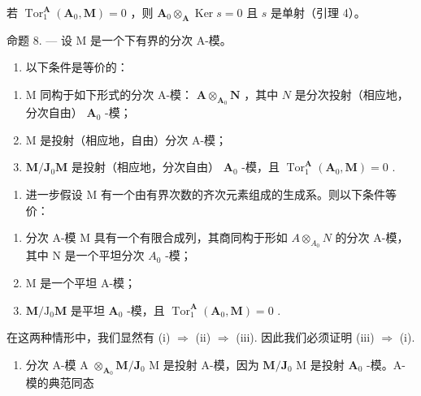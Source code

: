 若 \(\operatorname{Tor}_1^{\mathbf{A}}(\mathbf{A}_0, \mathbf{M}) = 0\) ，则 \(\mathbf{A}_0 \otimes_{\mathbf{A}} \operatorname{Ker} s = 0\) 且 \(s\) 是单射（引理 4）。

命题 8. --- 设 M 是一个下有界的分次 A-模。

\begin{enumerate}
\def\labelenumi{\alph{enumi})}
\tightlist
\item
  以下条件是等价的：
\end{enumerate}

\begin{enumerate}
\def\labelenumi{(\roman{enumi})}
\item
  M 同构于如下形式的分次 A-模： \(\mathbf{A} \otimes_{\mathbf{A}_0} \mathbf{N}\) ，其中 \(N\) 是分次投射（相应地，分次自由） \(\mathbf{A}_0\) -模；
\item
  M 是投射（相应地，自由）分次 A-模；
\item
  \(\mathbf{M} / \mathbf{J}_0\mathbf{M}\) 是投射（相应地，分次自由） \(\mathbf{A}_0\) -模，且 \(\operatorname{Tor}_1^{\mathbf{A}}(\mathbf{A}_0,\mathbf{M}) = 0\) .
\end{enumerate}

\begin{enumerate}
\def\labelenumi{\alph{enumi})}
\setcounter{enumi}{1}
\tightlist
\item
  进一步假设 M 有一个由有界次数的齐次元素组成的生成系。则以下条件等价：
\end{enumerate}

\begin{enumerate}
\def\labelenumi{(\roman{enumi})}
\item
  分次 A-模 M 具有一个有限合成列，其商同构于形如 \(A \otimes_{A_{0}} N\) 的分次 A-模，其中 N 是一个平坦分次 \(A_{0}\) -模；
\item
  M 是一个平坦 A-模；
\item
  \(\mathbf{M} / \mathrm{J}_0\mathbf{M}\) 是平坦 \(\mathbf{A}_0\) -模，且 \(\operatorname{Tor}_1^{\mathbf{A}}(\mathbf{A}_0,\mathbf{M}) = 0\) .
\end{enumerate}

在这两种情形中，我们显然有 (i) \(\Rightarrow\) (ii) \(\Rightarrow\) (iii). 因此我们必须证明 (iii) \(\Rightarrow\) (i).

\begin{enumerate}
\def\labelenumi{\alph{enumi})}
\tightlist
\item
  分次 A-模 A \(\otimes_{\mathbf{A}_0}\mathbf{M} / \mathbf{J}_0\) M 是投射 A-模，因为 \(\mathbf{M} / \mathbf{J}_0\) M 是投射 \(\mathbf{A}_0\) -模。A-模的典范同态
\end{enumerate}


